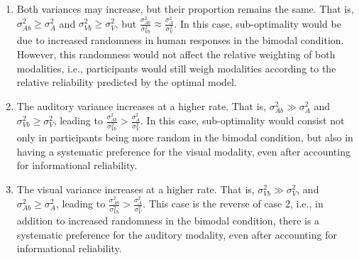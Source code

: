 \documentclass[english,floatsintext,man]{apa6}
\theoremstyle{definition}
\theoremstyle{definition}
\theoremstyle{definition}
\theoremstyle{remark}
\begin{document}
\begin{enumerate}
\def\labelenumi{\arabic{enumi})}
\item
  Both variances may increase, but their proportion remains the same.
  That is, \(\sigma^2_{Ab} \geqslant \sigma^2_{A}\) and
  \(\sigma^2_{Vb} \geqslant \sigma^2_{V}\), but
  \(\frac{\sigma^2_{Ab}}{\sigma^2_{Vb}} \approx \frac{\sigma^2_{A}}{\sigma^2_{V}}\).
  In this case, sub-optimality would be due to increased randomness in
  human responses in the bimodal condition. However, this randomness
  would not affect the relative weighting of both modalities, i.e.,
  participants would still weigh modalities according to the relative
  reliability predicted by the optimal model.
\item
  The auditory variance increases at a higher rate. That is,
  \(\sigma^2_{Ab} \gg \sigma^2_{A}\) and
  \(\sigma^2_{Vb} \geqslant \sigma^2_{V}\), leading to
  \(\frac{\sigma^2_{Ab}}{\sigma^2_{Vb}} > \frac{\sigma^2_{A}}{\sigma^2_{V}}\).
  In this case, sub-optimality would consist not only in participants
  being more random in the bimodal condition, but also in having a
  systematic preference for the visual modality, even after accounting
  for informational reliability.
\item
  The visual variance increases at a higher rate. That is,
  \(\sigma^2_{Vb} \gg \sigma^2_{V}\), and
  \(\sigma^2_{Ab} \geqslant \sigma^2_{A}\), leading to
  \(\frac{\sigma^2_{Ab}}{\sigma^2_{Vb}} > \frac{\sigma^2_{A}}{\sigma^2_{V}}\).
  This case is the reverse of case 2, i.e., in addition to increased
  randomness in the bimodal condition, there is a systematic preference
  for the auditory modality, even after accounting for informational
  reliability.
\end{enumerate}
\end{document}
